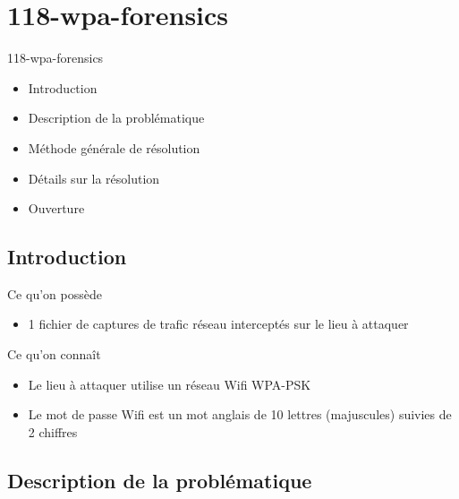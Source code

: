 \documentclass{beamer}
\begin{document}
	\section{118-wpa-forensics}

	\begin{frame}
	\begin{block}{118-wpa-forensics}
		\begin{itemize}
		[circle]
		\item Introduction
		\item Description de la problématique
		\item Méthode générale de résolution
		\item Détails sur la résolution
		\item Ouverture
		\end{itemize}
	\end{block}

	\end{frame}

	\subsection{Introduction}

	\begin{frame}

	\begin{block}{Ce qu'on possède}
		\begin{itemize}
			\item 1 fichier de captures de trafic réseau interceptés sur le lieu à attaquer
		\end{itemize}
	\end{block}

	\begin{block}{Ce qu'on connaît}
		\begin{itemize}
			\item Le lieu à attaquer utilise un réseau Wifi WPA-PSK
			\item Le mot de passe Wifi est un mot anglais de 10 lettres (majuscules) suivies de 2 chiffres
		\end{itemize}
	\end{block}

	\end{frame}

	\subsection{Description de la problématique}
\end{document}
